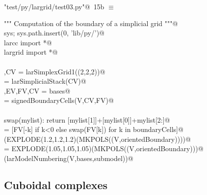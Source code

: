 \documentclass[11pt,oneside]{article}	%
\begin{document}
\begin{flushleft} \small \label{scrap22}
\protect{}\verb@"test/py/largrid/test03.py"@\nobreak\ {\footnotesize 15b }$\equiv$
\vspace{-1ex}
\begin{list}{}{} \item
\mbox{}\verb@""" Computation of the boundary of a simplicial grid """@\\
\mbox{}\verb@import sys; sys.path.insert(0, 'lib/py/')@\\
\mbox{}\verb@from larcc import *@\\
\mbox{}\verb@from largrid import *@\\
\mbox{}\verb@@\\
\mbox{}\verb@V,CV = larSimplexGrid1((2,2,2))@\\
\mbox{}\verb@bases = larSimplicialStack(CV)@\\
\mbox{}\verb@VV,EV,FV,CV = bases@\\
\mbox{}\verb@boundaryCells = signedBoundaryCells(V,CV,FV)@\\
\mbox{}\verb@@\\
\mbox{}\verb@def swap(mylist): return [mylist[1]]+[mylist[0]]+mylist[2:]@\\
\mbox{}\verb@orientedBoundary = [FV[-k] if k<0 else swap(FV[k]) for k in boundaryCells]@\\
\mbox{}\verb@VIEW(EXPLODE(1.2,1.2,1.2)(MKPOLS((V,orientedBoundary))))@\\
\mbox{}\verb@submodel = EXPLODE(1.05,1.05,1.05)(MKPOLS((V,orientedBoundary)))@\\
\mbox{}\verb@VIEW(larModelNumbering(V,bases,submodel))@\\
\mbox{}\verb@@{\NWsep}
\end{list}
\vspace{-2ex}
\end{flushleft}

\subsection{Cuboidal complexes}
\end{document}
